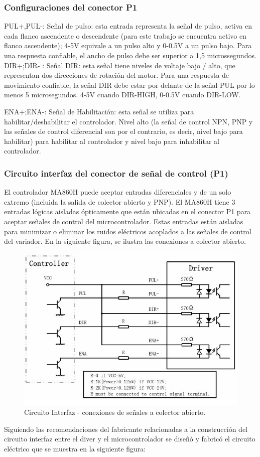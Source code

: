 \subsubsection{Configuraciones del conector P1}
PUL+,PUL-: Señal de pulso: esta entrada representa la señal de pulso, activa en cada flanco ascendente o descendente (para este trabajo se encuentra activo en flanco ascendente); 4-5V equivale a un pulso alto y 0-0.5V a un pulso bajo. Para una respuesta confiable, el ancho de pulso debe ser superior a 1,5 microssegundos. 
DIR+;DIR- : Señal DIR: esta señal tiene niveles de voltaje bajo / alto, que representan dos direcciones de rotación del motor. Para una respuesta de movimiento confiable, la señal DIR debe estar por delante de la señal PUL por lo menos 5 microsegundos. 4-5V cuando DIR-HIGH, 0-0.5V cuando DIR-LOW. 

ENA+;ENA-: Señal de Habilitación: esta señal se utiliza para habilitar/deshabilitar el controlador. Nivel alto (la señal de control NPN, PNP y las señales de control diferencial son por el contrario, es decir, nivel bajo para habilitar) para habilitar al controlador y nivel bajo para inhabilitar al controlador.
\subsubsection{Circuito interfaz del conector de señal de control (P1)}
El controlador MA860H puede aceptar entradas diferenciales y de un solo extremo (incluida la salida de colector abierto y PNP). El MA860H tiene 3 entradas lógicas aisladas ópticamente que están ubicadas en el conector P1 para aceptar señales de control del microcontrolador. Estas entradas están aisladas para minimizar o eliminar los ruidos eléctricos acoplados a las señales de control del variador. En la siguiente figura, se ilustra las conexiones a colector abierto.
\begin{figure}[h]
\centering
\includegraphics[scale=.65]{./Figures/circuitointerfaz-driver.jpeg}
\caption{Circuito Interfaz - conexiones de señales a colector abierto.}
\label{fig:circuito interfaz}
\end{figure}
Siguiendo las recomendaciones del fabricante relacionadas a la construcción del circuito interfaz entre el diver y el microcontrolador se diseñó y fabricó el circuito eléctrico que se muestra en la siguiente figura:

